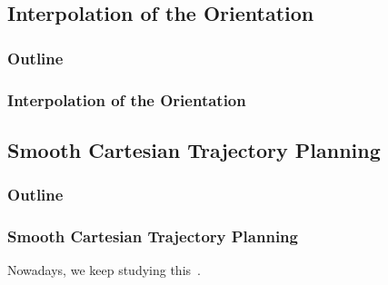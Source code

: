 \documentclass[10pt, aspectratio=169]{beamer}
\theoremstyle{remark}
\theoremstyle{definition}
\begin{document}
\subsection{Interpolation of the Orientation}
\begin{frame}
	\frametitle{Outline} %
\end{frame}
\begin{frame}[allowframebreaks]
\frametitle{Interpolation of the Orientation}


\end{frame}


\subsection{Smooth Cartesian Trajectory Planning}
\begin{frame}
	\frametitle{Outline} %
\end{frame}
\begin{frame}[allowframebreaks]
\frametitle{Smooth Cartesian Trajectory Planning}


Nowadays, we keep studying this~\cite{tagliavini2023smooth}.

\end{frame}
\end{document}
